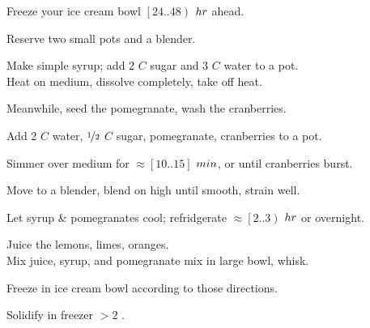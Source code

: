 \begin{preparation}
\item Freeze your ice cream bowl $\left[24 .. 48\right)$ $\hour$ ahead.
\item Reserve two small pots and a blender.
\item Make simple syrup; add $2$ $C$ sugar and 3 $C$ water to a pot.\\
	Heat on medium, dissolve completely, take off heat.
\item Meanwhile, seed the pomegranate, wash the cranberries.
\item Add 2 $C$ water, $\onehalf$ $C$ sugar, pomegranate, cranberries to a pot.
\item Simmer over medium for $\approx [10..15]$ $\minute$, or until cranberries burst.
\item Move to a blender, blend on high until smooth, strain well.
\item Let syrup \& pomegranates cool; refridgerate $\approx \left[2..3\right)$ $\hour$ or overnight.
\item Juice the lemons, limes, oranges.\\
	Mix juice, syrup, and pomegranate mix in large bowl, whisk.
\item Freeze in ice cream bowl according to those directions.
\item Solidify in freezer $>2$ \hour.
\end{preparation}


\recipeend%
